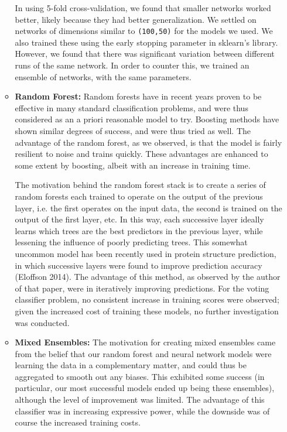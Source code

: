 \begin{itemize}
\begin{itemize}
    \hspace{8mm} In using 5-fold cross-validation, we found that smaller networks worked better, likely because they had better generalization. We settled on networks of dimensions similar to \texttt{(100,50)} for the models we used. We also trained these using the early stopping parameter in sklearn's library. However, we found that there was significant variation between different runs of the same network. In order to counter this, we trained an ensemble of networks, with the same parameters.

    \item \textbf{Random Forest:} Random forests have in recent years proven to be effective in many standard classification problems, and were thus considered as an a priori reasonable model to try. Boosting methods have shown similar degrees of success, and were thus tried as well. The advantage of the random forest, as we observed, is that the model is fairly resilient to noise and trains quickly. These advantages are enhanced to some extent by boosting, albeit with an increase in training time.

    \hspace{8mm} The motivation behind the random forest stack is to create a series of random forests each trained to operate on the output of the previous layer, i.e. the first operates on the input data, the second is trained on the output of the first layer, etc. In this way, each successive layer ideally learns which trees are the best predictors in the previous layer, while lessening the influence of poorly predicting trees. This somewhat uncommon model has been recently used in protein structure prediction, in which successive layers were found to improve prediction accuracy (Eloffson 2014). The advantage of this method, as observed by the author of that paper, were in iteratively improving predictions. For the voting classifier problem, no consistent increase in training scores were observed; given the increased cost of training these models, no further investigation was conducted.

    \item \textbf{Mixed Ensembles:} The motivation for creating mixed ensembles came from the belief that our random forest and neural network models were learning the data in a complementary matter, and could thus be aggregated to smooth out any biases. This exhibited some success (in particular, our most successful models ended up being these ensembles), although the level of improvement was limited. The advantage of this classifier was in increasing expressive power, while the downside was of course the increased training costs.


\end{itemize}
\end{itemize}
